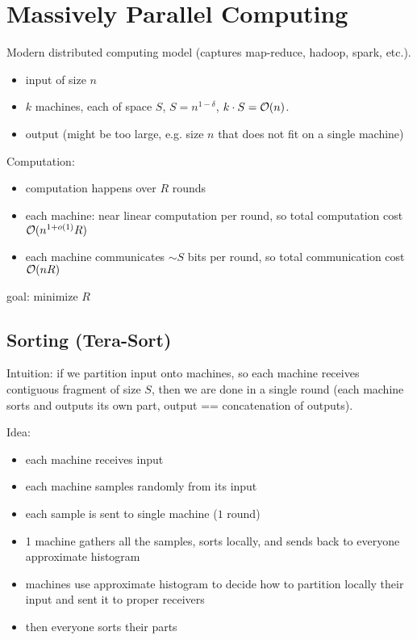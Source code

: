 \documentclass[11pt]{article}
\begin{document}

\section{Massively Parallel Computing \cite{DBLP:conf/spaa/LattanziMSV11}}
Modern distributed computing model (captures map-reduce, hadoop, spark, etc.).

\begin{itemize}
\item input of size $n$
\item $k$ machines, each of space $S$, $S = n^{1-\delta}$, $k \cdot S = \mathcal{O}(n)$.
\item output (might be too large, e.g. size $n$ that does not fit on a single machine)
\end{itemize}

Computation:
\begin{itemize}
\item computation happens over $R$ rounds
\item each machine: near linear computation per round, so total computation cost $\mathcal{O}(n^{1+o(1)} R)$
\item each machine communicates $\sim S$ bits per round, so total communication cost $\mathcal{O}(n R)$
\end{itemize}
goal: minimize $R$

\subsection{Sorting (Tera-Sort)}
Intuition: if we partition input onto machines, so each machine receives contiguous fragment of size $S$, then we are done in a single round (each machine sorts and outputs its own part, output == concatenation of outputs).

Idea: 
\begin{itemize}
\item each machine receives input
\item each machine samples randomly from its input
\item each sample is sent to single machine ($1$ round)
\item 1 machine gathers all the samples, sorts locally, and sends back to everyone approximate histogram
\item machines use approximate histogram to decide how to partition locally their input and sent it to proper receivers
\item then everyone sorts their parts
\end{itemize}
\end{document}
